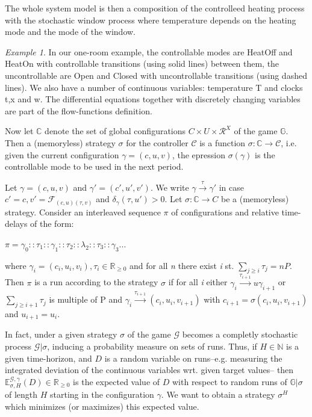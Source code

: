     The whole system model is then a composition of the controlleed heating process
    with the stochastic window process where temperature depends on the heating  mode 
    and the mode of the window. 


    \emph{Example 1}. In our one-room example, the controllable modes are {\color{RawSienna} HeatOff}
    and {\color{RawSienna} HeatOn} with controllable transitions (using solid lines) between
    them, the uncontrollable are {\color{RawSienna} Open} and {\color{RawSienna} Closed} with
    uncontrollable transitions (using dashed lines). We also have a number of continuous 
    variables: temperature T and clocks t,x and w. The differential equations together with
    discretely changing variables are part of the flow-functions definition.

    Now let $\mathbb{C}$ denote the set of global configurations $C\times U \times \mathcal{R}^X$
    of the game $\mathbb{G}$. Then a (memoryless) strategy $\sigma$ for the controller $\mathcal{C}$
    is a function $\sigma: \mathbb{C} \rightarrow \mathcal{C}$, i.e. given the current
    configuration $\gamma = (c,u,v)$, the epression $\sigma(\gamma)$ is the controllable mode
    to be used in the next period.

    Let $\gamma = (c,u,v)$ and $\gamma' = (c',u',v')$. We write $\gamma \xrightarrow{\tau} \gamma'$ 
    in case $c'=c, v'=\mathcal{F}_{(c,u)(\tau,v)}$ and $\delta_{\gamma}(\tau,u') > 0$. Let $\sigma: \mathbb{C} \rightarrow C$
    be a (memoryless) strategy. Consider an interleaved sequence $\pi$ of configurations and
    relative time-delays of the form:

    $\pi = \gamma_0 :: \tau_1 :: \gamma_1 :: \tau_2 :: \lambda_2 :: \tau_3 :: \gamma_3 ...$

    where $\gamma_i = (c_i,u_i,v_i), \tau_i \in \mathbb{R}_{\geqslant 0}$ and for all \emph{n} 
    there  exist \emph{i} st. $\sum_{j \geqslant i}\tau_j = nP$. Then $\pi$ is a run according
    to the strategy $\sigma$ if for all \emph{i} either $\gamma_i \xrightarrow{\tau_{i+1}}u \gamma_{i+1}$
    or $\sum_{j \geqslant i+1}\tau_j$ is multiple of P and $\gamma_i \xrightarrow{\tau_{i+1}} (c_i,u_i,v_{i+1})$
    with $c_{i+1} = \sigma(c_i,u_i,v_{i+1})$ and $u_{i+1}=u_i$.

    In fact, under a given strategy $\sigma$ of the game $\mathcal{G}$ becomes a completly 
    stochastic process $\mathcal{G}|\sigma$, inducing a probability measure on sets of runs.
    Thus, if $H \in \mathbb{N}$ is a given time-horizon, and $D$ is a random variable on runs--e.g.
    measuring the integrated deviation of the continuous variables wrt. given target values--
    then $\mathbb{E}^{\mathcal{G,\gamma}}_{\sigma,H}(D) \in \mathbb{R}_{\geqslant 0}$ is 
    the expected value of $D$ with respect to random runs of $\mathbb{G}|\sigma$ of length
    $H$ starting in the configuration $\gamma$. We want to obtain a strategy $\sigma^H$ which
    minimizes (or maximizes) this expected value.

